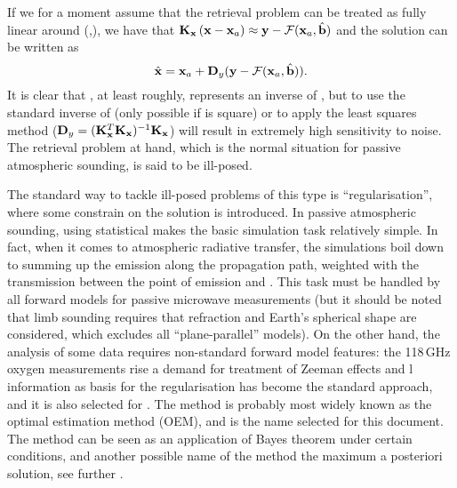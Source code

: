 If we for a moment assume that the retrieval problem can be treated as fully
linear around (,\FrwMdlVctHat), we
have that $\mathbf{K}_{\mathbf{x}}\left(\mathbf{x}-\mathbf{x}_{a}\right)\approx \mathbf{y}
-\mathcal{F}(\mathbf{x}_{a},\hat{\mathbf{b}})$ and the solution can be written as
\begin{equation}
  \label{eq:linretrieval}
  \hat{\mathbf{x}} = \mathbf{x}_{a} + \mathbf{D}_{y}(\mathbf{y}-\mathcal{F}(\mathbf{x}_{a},\hat{\mathbf{b}})).
\end{equation}
It is clear that \CtrFncMtr, at least roughly, represents an inverse of
\aWfnMtr{\SttVct}, but to use the standard inverse of \aWfnMtr{\SttVct} (only
possible if \aWfnMtr{\SttVct} is square) or to apply the least squares method
($\mathbf{D}_{y}=(\mathbf{K}_{\mathbf{x}}^T\mathbf{K}_{\mathbf{x}})^{-1}\mathbf{K}_{\mathbf{x}}$)
will result in extremely high sensitivity to noise. The retrieval problem at
hand, which is the normal situation for passive atmospheric sounding, is said
to be ill-posed.

The standard way to tackle ill-posed problems of this type is
``regularisation'', where some constrain on the solution is introduced. In
passive atmospheric sounding, using statistical makes the
basic simulation task relatively simple. In fact, when it comes to atmospheric
radiative transfer, the simulations boil down to summing up the emission along
the propagation path, weighted with the transmission between the point of
emission and \smr. This task must be handled by all forward models for passive
microwave measurements (but it should be noted that limb sounding requires that
refraction and Earth's spherical shape are considered, which excludes all
``plane-parallel'' models). On the other hand, the analysis of some data
requires non-standard forward model features: the 118\,GHz oxygen measurements
rise a demand for treatment of Zeeman effects and l information as basis for the
regularisation has become the standard approach, and it is also selected for
\smr. The method is probably most widely known as the optimal estimation method
(OEM), and is the name selected for this document. The method can be seen as an
application of Bayes theorem under certain conditions, and another possible
name of the method the maximum a posteriori solution, see further
\citet{rodgers:00}.

